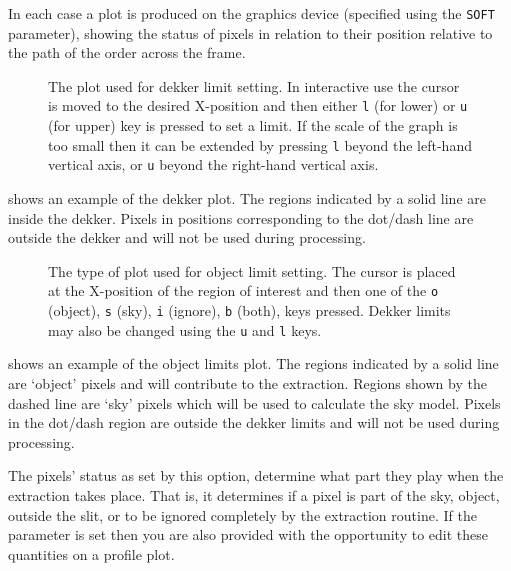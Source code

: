 In each case a plot is produced on the graphics device (specified using
the \verb+SOFT+ parameter), showing the status of pixels in relation to their
position relative to the path of the order across the frame.

\begin{figure}
\begin{center}
{\leavevmode\epsfysize=136mm}

\parbox{140mm}{
\caption{The plot used for dekker limit setting. In interactive use
the cursor is moved to the desired X-position and then either {\tt l}
(for lower) or {\tt u} (for upper) key is pressed to set a limit. If
the scale of the graph is too small then it can be extended by
pressing {\tt l} beyond the left-hand vertical axis, or {\tt u}
beyond the right-hand vertical axis.}
\label{fi_dekker}
}
\end{center}
\end{figure}

shows an example of the dekker plot. The regions
indicated by a solid line are inside the dekker. Pixels in positions
corresponding to the dot/dash line are outside the dekker and will not
be used during processing.

\begin{figure}
\begin{center}
{\leavevmode\epsfysize=136mm}

\parbox{140mm}{
\caption{The type of plot used for object limit setting. The cursor is
placed at the X-position of the region of interest and then one of
the {\tt o} (object), {\tt s} (sky), {\tt i} (ignore), {\tt b}
(both), keys pressed. Dekker limits may also be changed using the
{\tt u} and {\tt l} keys.}
\label{fi_objlim}
}
\end{center}
\end{figure}

shows an example of the object limits plot. The
regions indicated by a solid line are `object' pixels and will
contribute to the extraction. Regions shown by the dashed line are `sky'
pixels which will be used to calculate the sky model. Pixels in the
dot/dash region are outside the dekker limits and will not be used
during processing.

The pixels' status as set by this option, determine what part they play
when the extraction takes place. That is, it determines if a pixel is
part of the sky, object, outside the slit, or to be ignored completely
by the extraction routine.  If the parameter
 is set then you
are also provided with the opportunity to edit these quantities on a profile
plot.

